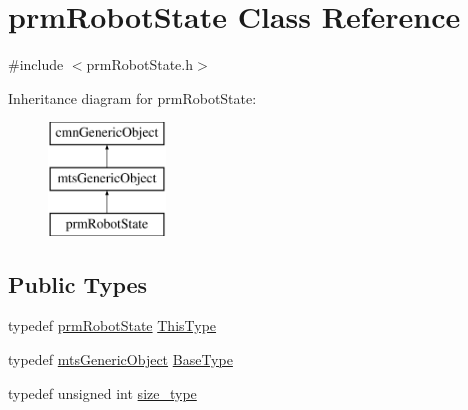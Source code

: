 \hypertarget{classprm_robot_state}{}\section{prm\+Robot\+State Class Reference}
\label{classprm_robot_state}


{\ttfamily \#include $<$prm\+Robot\+State.\+h$>$}

Inheritance diagram for prm\+Robot\+State\+:\begin{figure}[H]
\begin{center}
\leavevmode
\includegraphics[height=3.000000cm]{d3/d02/classprm_robot_state}
\end{center}
\end{figure}
\subsection*{Public Types}
\begin{DoxyCompactItemize}
\item 
typedef \hyperlink{classprm_robot_state}{prm\+Robot\+State} \hyperlink{classprm_robot_state_ae29f0a2f1d1f44400da6e8191bc06475}{This\+Type}
\item 
typedef \hyperlink{classmts_generic_object}{mts\+Generic\+Object} \hyperlink{classprm_robot_state_a602400b6ea7b54575290cc5207fc0167}{Base\+Type}
\item 
typedef unsigned int \hyperlink{classprm_robot_state_a2cf2c739d5b3cdd3f9d44e2878183d90}{size\+\_\+type}
\end{DoxyCompactItemize}
